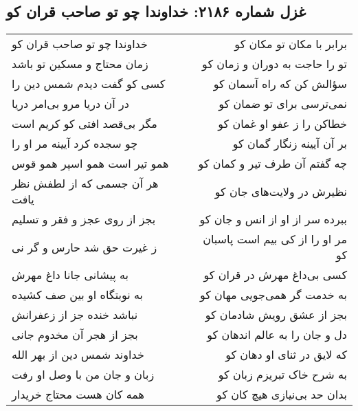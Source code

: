 \begin{center}
\section*{غزل شماره ۲۱۸۶: خداوندا چو تو صاحب قران کو}
\label{sec:2186}
\begin{longtable}{l p{0.5cm} r}
خداوندا چو تو صاحب قران کو
&&
برابر با مکان تو مکان کو
\\
زمان محتاج و مسکین تو باشد
&&
تو را حاجت به دوران و زمان کو
\\
کسی کو گفت دیدم شمس دین را
&&
سؤالش کن که راه آسمان کو
\\
در آن دریا مرو بی‌امر دریا
&&
نمی‌ترسی برای تو ضمان کو
\\
مگر بی‌قصد افتی کو کریم است
&&
خطاکن را ز عفو او غمان کو
\\
چو سجده کرد آیینه مر او را
&&
بر آن آیینه زنگار گمان کو
\\
همو تیر است همو اسپر همو قوس
&&
چه گفتم آن طرف تیر و کمان کو
\\
هر آن جسمی که از لطفش نظر یافت
&&
نظیرش در ولایت‌های جان کو
\\
بجز از روی عجز و فقر و تسلیم
&&
ببرده سر از او از انس و جان کو
\\
ز غیرت حق شد حارس و گر نی
&&
مر او را از کی بیم است پاسبان کو
\\
به پیشانی جانا داغ مهرش
&&
کسی بی‌داغ مهرش در قران کو
\\
به نوبتگاه او بین صف کشیده
&&
به خدمت گر همی‌جویی مهان کو
\\
نباشد خنده جز از زعفرانش
&&
بجز از عشق رویش شادمان کو
\\
بجز از هجر آن مخدوم جانی
&&
دل و جان را به عالم اندهان کو
\\
خداوند شمس دین از بهر الله
&&
که لایق در ثنای او دهان کو
\\
زبان و جان من با وصل او رفت
&&
به شرح خاک تبریزم زبان کو
\\
همه کان هست محتاج خریدار
&&
بدان حد بی‌نیازی هیچ کان کو
\\
\end{longtable}
\end{center}
